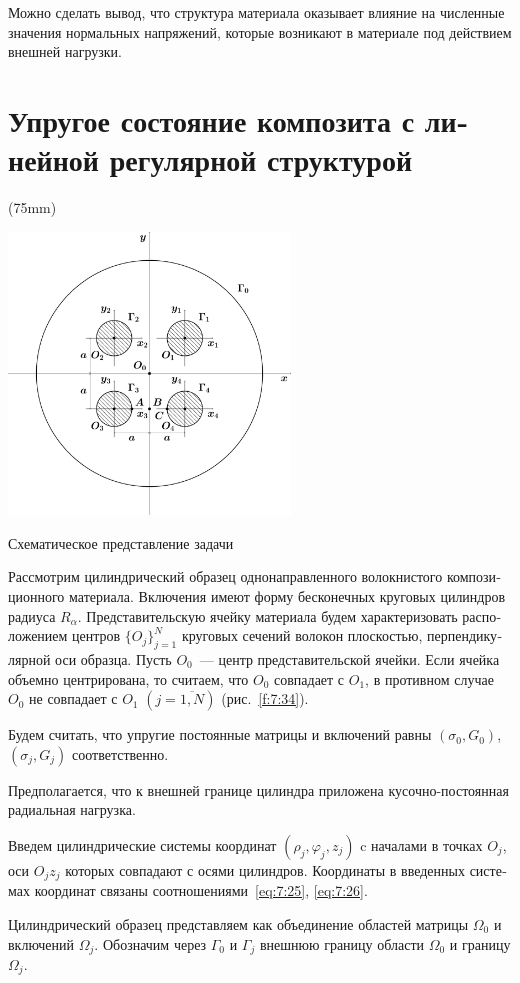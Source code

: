 \begin{russian}
Можно сделать вывод, что структура материала оказывает влияние на численные значения нормальных напряжений, которые возникают в материале под действием внешней нагрузки.

\section{Упругое состояние композита с линейной регулярной структурой}

\sidefig*(75mm){
\includegraphics[width=7.5cm]{incl-scheme.pdf}
\caption{Схематическое представление задачи}
\label{f:7:34}
}{Рассмотрим цилиндрический образец однонаправленного волокнистого композиционного материала. Включения имеют форму бесконечных круговых цилиндров радиуса $R_\alpha$. Представительскую ячейку материала будем характеризовать расположением центров $\{O_j\}_{j=1}^N$ круговых сечений волокон плоскостью, перпендикулярной оси образца. Пусть $O_0$~--- центр представительской ячейки. Если ячейка объемно центрирована, то считаем, что $O_0$ совпадает с $O_1$, в противном случае $O_0$ не совпадает с $O_1$ $(j=\overline{1,N})$ (рис.~\ref{f:7:34}).

Будем считать, что упругие постоянные матрицы и включений равны $(\sigma_0, G_0)$, $(\sigma_j,G_j)$ соответственно.} Предполагается, что к внешней границе цилиндра приложена ку\-соч\-но-пос\-то\-ян\-ная радиальная нагрузка.

Введем цилиндрические системы координат $(\rho_j,\varphi_j,z_j)$ c началами в точках $O_j$, оси $O_jz_j$ которых совпадают с осями цилиндров. Координаты в введенных системах координат связаны соотношениями~\eqref{eq:7:25}, \eqref{eq:7:26}.

Цилиндрический образец представляем как объединение областей матрицы $\Omega_0$ и включений $\Omega_j$. Обозначим через $\Gamma_0$ и $\Gamma_j$ внешнюю границу области $\Omega_0$ и границу $\Omega_j$.


\end{russian}
